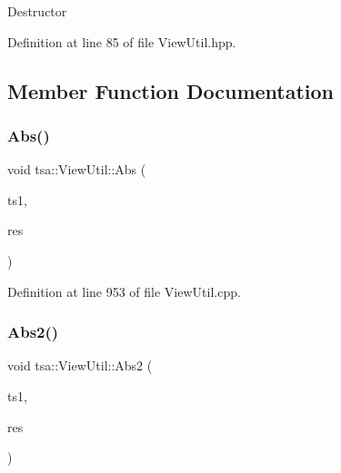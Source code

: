 Destructor 

Definition at line 85 of file View\+Util.\+hpp.



\subsection{Member Function Documentation}
\mbox{\label{classtsa_1_1_view_util_ad297c324daf336cab231821a72770cc6}} 
\subsubsection{\texorpdfstring{Abs()}{Abs()}}
{\footnotesize\ttfamily void tsa\+::\+View\+Util\+::\+Abs (\begin{DoxyParamCaption}\item[{\hyperlink{namespacetsa_ab32775c889b53c40fa83939f22372b75}{Seq\+View\+Complex} \&}]{ts1,  }\item[{\hyperlink{namespacetsa_ac599574bcc094eda25613724b8f3ca9e}{Seq\+View\+Double} \&}]{res }\end{DoxyParamCaption})\hspace{0.3cm}{\ttfamily [static]}}



Definition at line 953 of file View\+Util.\+cpp.

\mbox{\label{classtsa_1_1_view_util_a287fcc46c379b13cb9e309e4d1113cef}} 
\subsubsection{\texorpdfstring{Abs2()}{Abs2()}}
{\footnotesize\ttfamily void tsa\+::\+View\+Util\+::\+Abs2 (\begin{DoxyParamCaption}\item[{\hyperlink{namespacetsa_ab32775c889b53c40fa83939f22372b75}{Seq\+View\+Complex} \&}]{ts1,  }\item[{\hyperlink{namespacetsa_ac599574bcc094eda25613724b8f3ca9e}{Seq\+View\+Double} \&}]{res }\end{DoxyParamCaption})\hspace{0.3cm}{\ttfamily [static]}}



